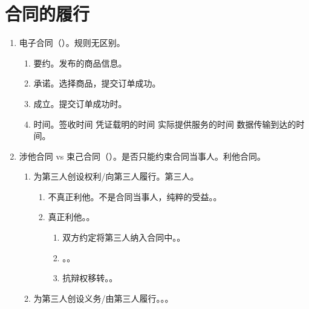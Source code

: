 \section{合同的履行}
\begin{enumerate}
  \item 电子合同（）。规则无区别。
        \begin{enumerate}
          \item 要约。发布的商品信息。
          \item 承诺。选择商品，提交订单成功。
          \item 成立。提交订单成功时。
          \item 时间。签收时间 \dy 凭证载明的时间 \dy 实际提供服务的时间 \dy 数据传输到达的时间。
        \end{enumerate}
  \item 涉他合同 vs 束己合同（）。是否只能约束合同当事人。利他合同。
        \begin{enumerate}
          \item 为第三人创设权利/向第三人履行。第三人。
                \begin{enumerate}
                  \item 不真正利他。不是合同当事人，纯粹的受益。。
                  \item 真正利他。。
                        \begin{enumerate}
                          \item 双方约定将第三人纳入合同中。。
                          \item {}。。
                          \item 抗辩权移转。。
                        \end{enumerate}
                \end{enumerate}
          \item 为第三人创设义务/由第三人履行。。。
        \end{enumerate}


\end{enumerate}
